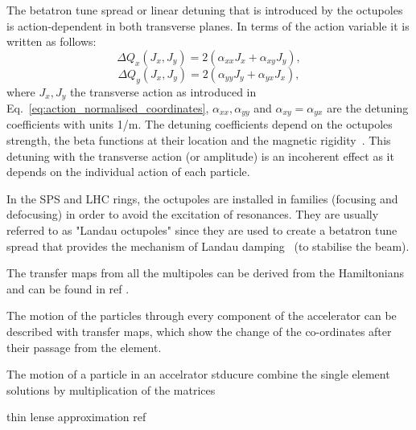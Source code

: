 The betatron tune spread or linear detuning that is introduced by the octupoles is action-dependent in both transverse planes. In terms of the action variable it is written as follows: %
\begin{equation}\label{eq:DQ_with_amplitude_horizontal}
    \Delta Q_x (J_x, J_y) = 2(\alpha_{xx} J_x + \alpha_{xy}J_y),
\end{equation}
\begin{equation}\label{eq:DQ_with_amplitude_vertical}
    \Delta Q_y (J_x, J_y) = 2(\alpha_{yy} J_y + \alpha_{yx}J_x),
\end{equation}
where $J_x, J_y$ the transverse action as introduced in Eq.~\eqref{eq:action_normalised_coordinates}, $\alpha_{xx}, \alpha_{yy}$ and $\alpha_{xy}=\alpha_{yx}$ are the detuning coefficients with units 1/m. The detuning coefficients depend on the octupoles strength, the beta functions at their location and the magnetic rigidity~\cite{Gareyte:321824}. This detuning with the transverse action (or amplitude) is an incoherent effect as it depends on the individual action of each particle.


In the SPS and LHC rings, the octupoles are installed in families (focusing and defocusing) in order to avoid the excitation of resonances. They are usually referred to as "Landau octupoles" since they are used to create a betatron tune spread that provides the mechanism of Landau damping~\cite{Herr:1982428} (to stabilise the beam).


The transfer maps from all the multipoles can be derived from the Hamiltonians and can be found in ref . 

The motion of the particles through every component of the accelerator can be described with transfer maps, which show the change of the co-ordinates after their passage from the element. 

The motion of a particle in an accelrator stducure combine the single element solutions by multiplication of the matrices


thin lense approximation ref




